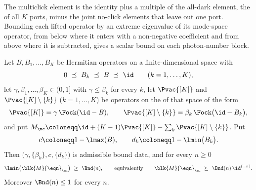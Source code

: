 
The multiclick element is the identity plus a multiple of the all-dark
element, the  of all
$K$ ports, minus the joint no-click elements that leave out one port. Bounding
each lifted operator by an extreme eigenvalue of its mode-space operator,
from below where it enters with a non-negative coefficient and from above
where it is subtracted, gives a scalar bound on each photon-number block.

\begin{theorem}\label{thm:multiclick-bound}
Let $B,B_1,\dots,B_K$ be Hermitian operators on a finite-dimensional space with
\begin{equation}\label{eq:bbkhyp}
  0\ \preceq\ B_k\ \preceq\ B\ \preceq\ \id\qquad(k=1,\dots,K),
\end{equation}
let $\gamma,\beta_1,\dots,\beta_K\in(0,1]$ with $\gamma\le\beta_k$ for every
$k$, let $\Pvac{[K]}$ and $\Pvac{[K]\setminus\{k\}}$ ($k=1,\dots,K$) be
operators on the  of that space of the form
\begin{equation}\label{eq:prefactorform}
  \Pvac{[K]}=\gamma\,\Fock(\id-B),\qquad
  \Pvac{[K]\setminus\{k\}}=\beta_k\,\Fock\big(\id-B_k\big),
\end{equation}
and put $M_{\mc}\coloneqq\id+(K-1)\Pvac{[K]}-\sum_k\Pvac{[K]\setminus\{k\}}$. Put
\begin{equation}\label{eq:cd}
  c\coloneqq1-\lmax(B),\qquad
  d_k\coloneqq1-\lmin\big(B_k\big).
\end{equation}
Then $\big(\gamma,\{\beta_k\},c,\{d_k\}\big)$ is admissible bound data, and for
every $n\ge0$
\begin{equation}\label{eq:mcbound}
  \lmin\big(\blk{M}{\eqn}_{\mc}\big)\ \ge\ \Bnd(n) ,
  \qquad\text{equivalently}\qquad
  \blk{M}{\eqn}_{\mc}\ \succeq\ \Bnd(n)\,\id^{(=n)} .
\end{equation}
Moreover $\Bnd(n)\le1$ for every $n$.
\end{theorem}

